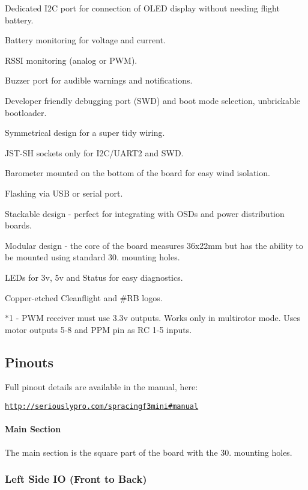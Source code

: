 \begin{DoxyItemize}
\item Dedicated I2\+C port for connection of O\+L\+E\+D display without needing flight battery.
\item Battery monitoring for voltage and current.
\item R\+S\+S\+I monitoring (analog or P\+W\+M).
\item Buzzer port for audible warnings and notifications.
\item Developer friendly debugging port (S\+W\+D) and boot mode selection, unbrickable bootloader.
\item Symmetrical design for a super tidy wiring.
\item J\+S\+T-\/\+S\+H sockets only for I2\+C/\+U\+A\+R\+T2 and S\+W\+D.
\item Barometer mounted on the bottom of the board for easy wind isolation.
\item Flashing via U\+S\+B or serial port.
\item Stackable design -\/ perfect for integrating with O\+S\+Ds and power distribution boards.
\item Modular design -\/ the core of the board measures 36x22mm but has the ability to be mounted using standard 30.\+5mm mounting holes.
\item L\+E\+Ds for 3v, 5v and Status for easy diagnostics.
\item Copper-\/etched Cleanflight and \#\+R\+B logos.
\end{DoxyItemize}

$\ast$1 -\/ P\+W\+M receiver must use 3.\+3v outputs. Works only in multirotor mode. Uses motor outputs 5-\/8 and P\+P\+M pin as R\+C 1-\/5 inputs.

\subsection*{Pinouts}

Full pinout details are available in the manual, here\+:

\href{http://seriouslypro.com/spracingf3mini#manual}{\tt http\+://seriouslypro.\+com/spracingf3mini\#manual}

\paragraph*{Main Section}

The main section is the square part of the board with the 30.\+5mm mounting holes.

\subsubsection*{Left Side I\+O (Front to Back)}

